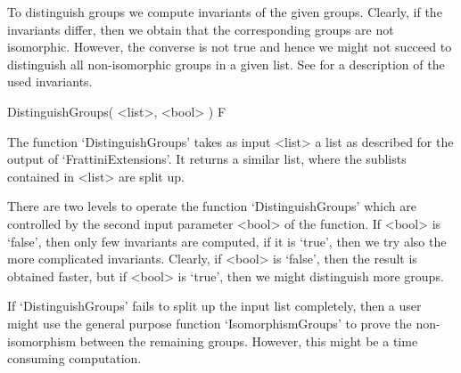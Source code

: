 To distinguish groups we compute invariants of the given groups.
Clearly, if the invariants differ, then we obtain that the corresponding
groups are not isomorphic. However, the converse is not true and hence
we might not succeed to distinguish all non-isomorphic groups in a
given list. See \cite{BE99} for a description of the used invariants.

\> DistinguishGroups( <list>, <bool> ) F

The function `DistinguishGroups' takes as input <list> a list as
described for the output of `FrattiniExtensions'. It returns a similar
list, where the sublists contained in <list> are split up.

There are two levels to operate the function `DistinguishGroups' which
are controlled by the second input parameter <bool> of the function.
If <bool> is `false', then only few invariants are computed, if it is
`true', then we try also the more complicated invariants.
Clearly, if <bool> is `false', then the result is obtained faster,
but if <bool> is `true', then we might distinguish more groups.

If `DistinguishGroups' fails to split up the input list completely,
then a user might use the general purpose function `IsomorphismGroups'
to prove the non-isomorphism between the remaining groups. However,
this might be a time consuming computation.
